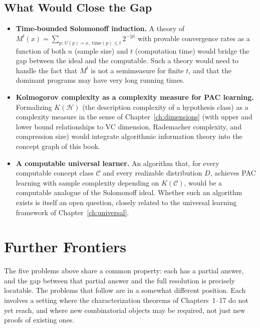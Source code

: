 \subsection{What Would Close the Gap}

\begin{itemize}[leftmargin=*]
\item \textbf{Time-bounded Solomonoff induction.}  A theory of
  $M^t(x) = \sum_{p:\, U(p)=x,\; \mathrm{time}(p) \leq t} 2^{-|p|}$
  with provable convergence rates as a function of both $n$ (sample size)
  and $t$ (computation time) would bridge the gap between the ideal and
  the computable.  Such a theory would need to handle the fact that
  $M^t$ is not a semimeasure for finite $t$, and that the dominant programs
  may have very long running times.

\item \textbf{Kolmogorov complexity as a complexity measure for PAC
  learning.}  Formalizing $K(\mathcal{H})$ (the description complexity of
  a hypothesis class) as a complexity measure in the sense of
  Chapter~\ref{ch:dimensions} (with upper and lower bound relationships
  to VC dimension, Rademacher complexity, and compression size) would
  integrate algorithmic information theory into the concept graph of this
  book.

\item \textbf{A computable universal learner.}  An algorithm that, for
  every computable concept class $\mathcal{C}$ and every realizable
  distribution $D$, achieves PAC learning with sample complexity depending
  on $K(\mathcal{C})$, would be a computable analogue of the Solomonoff
  ideal.  Whether such an algorithm exists is itself an open question,
  closely related to the universal learning framework of
  Chapter~\ref{ch:universal}.
\end{itemize}



\section{Further Frontiers}
\label{sec:further-frontiers}

The five problems above share a common property: each has a partial answer, and the gap between that partial answer and the full resolution is precisely locatable.  The problems that follow are in a somewhat different position.  Each involves a setting where the characterization theorems of Chapters~1--17 do not yet reach, and where new combinatorial objects may be required, not just new proofs of existing ones.


